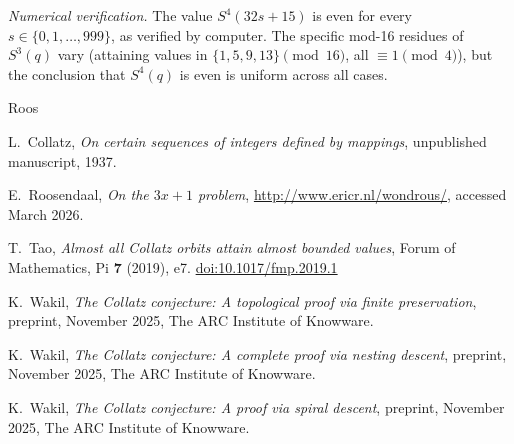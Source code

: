 \documentclass{amsart}
\theoremstyle{definition}
\theoremstyle{remark}
\begin{document}
\medskip
\noindent\textit{Numerical verification.}
The value $S^4(32s+15)$ is even for every $s\in\{0,1,\ldots,999\}$, as
verified by computer.
The specific mod-16 residues of $S^3(q)$ vary (attaining values in
$\{1,5,9,13\}\pmod{16}$, all $\equiv 1\pmod{4}$), but the conclusion that
$S^4(q)$ is even is uniform across all cases.



\begin{thebibliography}{Roos}

L.~Collatz,
\textit{On certain sequences of integers defined by mappings},
unpublished manuscript, 1937.

E.~Roosendaal,
\textit{On the $3x{+}1$ problem},
\url{http://www.ericr.nl/wondrous/},
accessed March 2026.

T.~Tao,
\textit{Almost all Collatz orbits attain almost bounded values},
Forum of Mathematics, Pi \textbf{7} (2019), e7.
\href{https://doi.org/10.1017/fmp.2019.1}{doi:10.1017/fmp.2019.1}

K.~Wakil,
\textit{The Collatz conjecture: A topological proof via finite preservation},
preprint, November 2025, The ARC Institute of Knowware.

K.~Wakil,
\textit{The Collatz conjecture: A complete proof via nesting descent},
preprint, November 2025, The ARC Institute of Knowware.

K.~Wakil,
\textit{The Collatz conjecture: A proof via spiral descent},
preprint, November 2025, The ARC Institute of Knowware.

\end{thebibliography}
\end{document}
